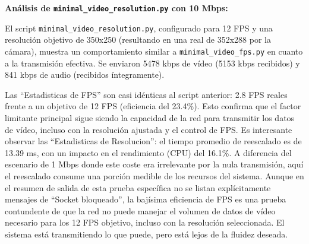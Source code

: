 \vspace{\baselineskip}
\newpage %

\textbf{Análisis de \texttt{minimal\_video\_resolution.py} con 10 Mbps:}

El script \texttt{minimal\_video\_resolution.py}, configurado para 12 FPS y una resolución objetivo de 350x250 (resultando en una real de 352x288 por la cámara), muestra un comportamiento similar a \texttt{minimal\_video\_fps.py} en cuanto a la transmisión efectiva. Se enviaron 5478 kbps de vídeo (5153 kbps recibidos) y 841 kbps de audio (recibidos íntegramente).

Las ``Estadisticas de FPS'' son casi idénticas al script anterior: 2.8 FPS reales frente a un objetivo de 12 FPS (eficiencia del 23.4\%). Esto confirma que el factor limitante principal sigue siendo la capacidad de la red para transmitir los datos de vídeo, incluso con la resolución ajustada y el control de FPS. Es interesante observar las ``Estadisticas de Resolucion'': el tiempo promedio de reescalado es de 13.39 ms, con un impacto en el rendimiento (CPU) del 16.1\%. A diferencia del escenario de 1 Mbps donde este coste era irrelevante por la nula transmisión, aquí el reescalado consume una porción medible de los recursos del sistema. Aunque en el resumen de salida de esta prueba específica no se listan explícitamente mensajes de ``Socket bloqueado'', la bajísima eficiencia de FPS es una prueba contundente de que la red no puede manejar el volumen de datos de vídeo necesario para los 12 FPS objetivo, incluso con la resolución seleccionada. El sistema está transmitiendo lo que puede, pero está lejos de la fluidez deseada.

\vspace{\baselineskip}

